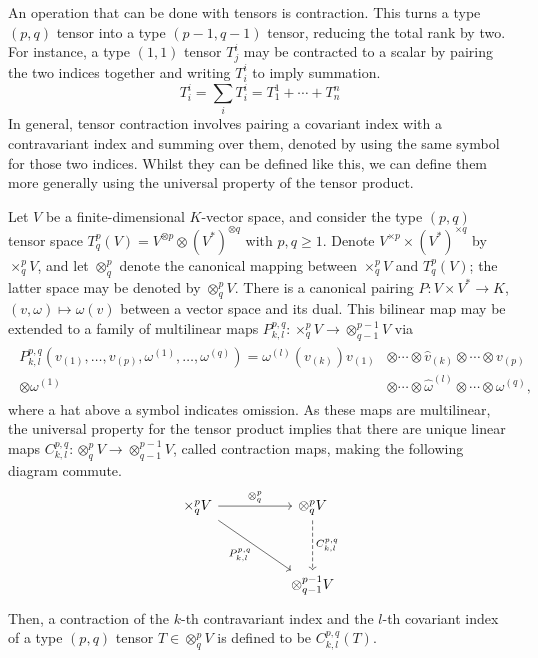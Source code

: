 \documentclass[a4paper,12pt]{article}
\begin{document}
An operation that can be done with tensors is contraction.
This turns a type $(p, q)$ tensor into a type $(p-1, q-1)$ tensor, reducing the total rank by two.
For instance, a type $(1, 1)$ tensor $T^i_j$ may be contracted to a scalar by pairing the two indices together and writing $T^i_i$ to imply summation.
\begin{equation}
    T^i_i = \sum_i T^i_i = T^1_1 + \cdots + T^n_n
\end{equation}
In general, tensor contraction involves pairing a covariant index with a contravariant index and summing over them, denoted by using the same symbol for those two indices.
Whilst they can be defined like this, we can define them more generally using the universal property of the tensor product.
\begin{definition}\label{def:tensor_contraction}
    Let $V$ be a finite-dimensional $K$-vector space, and consider the type $(p, q)$ tensor space $T^p_q(V) = V^{\otimes p} \otimes (V^*)^{\otimes q}$ with $p, q \geq 1$.
    Denote $V^{\times p} \times (V^*)^{\times q}$ by $\times^p_q V$, and let $\otimes^p_q$ denote the canonical mapping between $\times^p_q V$ and $T^p_q(V)$; the latter space may be denoted by $\otimes^p_q V$.
    There is a canonical pairing $P \colon V \times V^* \to K$, $(v, \omega) \mapsto \omega(v)$ between a vector space and its dual.
    This bilinear map may be extended to a family of multilinear maps $P^{p, q}_{k, l} \colon \times^p_q V \to \otimes^{p-1}_{q-1} V$ via
    \begin{align}
        \begin{split}
        P^{p, q}_{k, l}(v_{(1)}, \ldots, v_{(p)}, \omega^{(1)}, \ldots, \omega^{(q)}) = \omega^{(l)}(v_{(k)}) v_{(1)} &\otimes \cdots \otimes \widehat{v}_{(k)} \otimes \cdots \otimes v_{(p)} \\
        \otimes \omega^{(1)} &\otimes \cdots \otimes \widehat{\omega}^{(l)} \otimes \cdots \otimes \omega^{(q)},
        \end{split}
    \end{align}
    where a hat above a symbol indicates omission.
    As these maps are multilinear, the universal property for the tensor product implies that there are unique linear maps $C^{p, q}_{k, l} \colon \otimes^p_q V \to \otimes^{p-1}_{q-1} V$, called contraction maps, making the following diagram commute.
    \[\begin{tikzcd}
        {\times^p_q V} && {\otimes^p_q V} \\
        \\
        && {\otimes^{p-1}_{q-1} V}
        \arrow["\otimes^p_q", from=1-1, to=1-3]
        \arrow["P^{p, q}_{k, l}"', from=1-1, to=3-3]
        \arrow["C^{p, q}_{k, l}", dashed, from=1-3, to=3-3]
    \end{tikzcd}\]
    Then, a contraction of the $k$-th contravariant index and the $l$-th covariant index of a type $(p, q)$ tensor $T \in \otimes^p_q V$ is defined to be $C^{p, q}_{k, l}(T)$.
\end{definition}
\end{document}
